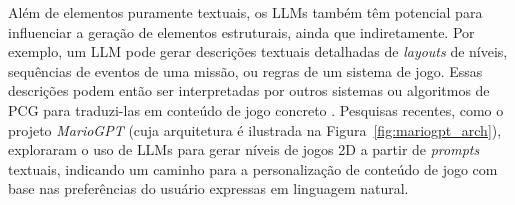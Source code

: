 Além de elementos puramente textuais, os \gls{LLM}s também têm potencial para
influenciar a geração de elementos estruturais, ainda que indiretamente. Por
exemplo, um \gls{LLM} pode gerar descrições textuais detalhadas de
\textit{layouts} de níveis, sequências de eventos de uma missão, ou regras de um
sistema de jogo. Essas descrições podem então ser interpretadas por outros
sistemas ou algoritmos de \gls{PCG} para traduzi-las em conteúdo de jogo
concreto \cite{maleki2024procedural}.  Pesquisas recentes, como o projeto
\textit{MarioGPT} (cuja arquitetura é ilustrada na Figura~\ref{fig:mariogpt_arch}),
exploraram o uso de \gls{LLM}s para gerar níveis de jogos 2D a partir de
\textit{prompts} textuais, indicando um caminho para a personalização de
conteúdo de jogo com base nas preferências do usuário expressas em linguagem
natural.
